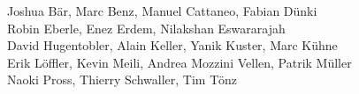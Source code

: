 %
%
%
Joshua Bär,			%
Marc Benz,			%
Manuel Cattaneo,		%
Fabian Dünki%
\\
Robin Eberle,			%
Enez Erdem,			%
Nilakshan Eswararajah%
\\
David Hugentobler,		%
Alain Keller,			%
Yanik Kuster,			%
Marc Kühne%
\\
Erik Löffler,			%
Kevin Meili,			%
Andrea Mozzini Vellen,		%
Patrik Müller%
\\
Naoki Pross,			%
Thierry Schwaller,		%
Tim Tönz			%

